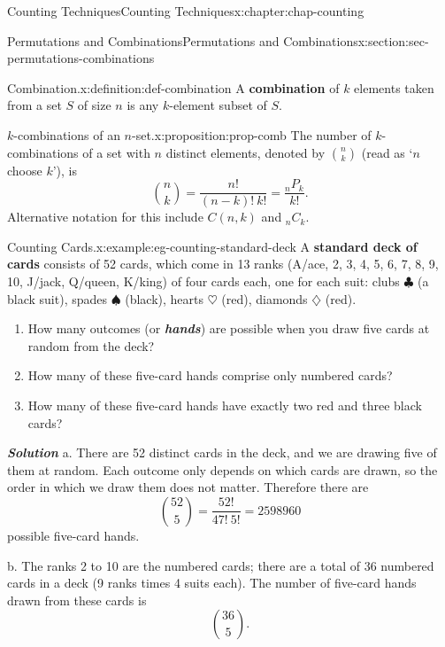 \documentclass[oneside,10pt,]{book}
\newcommand{\alert}[1]{\textbf{\textit{#1}}}
\newcommand{\terminology}[1]{\textbf{#1}}
\numberwithin{equation}{section}
\begin{document}
\begin{chapterptx}{Counting Techniques}{}{Counting Techniques}{}{}{x:chapter:chap-counting}
\begin{sectionptx}{Permutations and Combinations}{}{Permutations and Combinations}{}{}{x:section:sec-permutations-combinations}
\begin{definition}{Combination.}{x:definition:def-combination}
A \terminology{combination} of \(k\) elements taken from a set \(S\) of size \(n\) is any \(k\)-element subset of \(S\).%
\end{definition}
\begin{proposition}{\(k\)-combinations of an \(n\)-set.}{}{x:proposition:prop-comb}%
The number of \(k\)-combinations of a set with \(n\) distinct elements, denoted by \(\displaystyle\binom{n}{k}\) (read as `\(n\) choose \(k\)'), is%
\begin{equation*}
\binom{n}{k} = \dfrac{n!}{(n-k)!\ k!} = \dfrac{{}_nP_k}{k!}\text{.}
\end{equation*}
Alternative notation for this include \(C(n,k)\) and \(_nC_k\).%
\end{proposition}
\begin{example}{Counting Cards.}{x:example:eg-counting-standard-deck}%
A \terminology{standard deck of cards} consists of 52 cards, which come in 13 ranks (A\slash{}ace, 2, 3, 4, 5, 6, 7, 8, 9, 10, J\slash{}jack, Q\slash{}queen, K\slash{}king) of four cards each, one for each suit: clubs \(\clubsuit\) (a black suit), spades \(\spadesuit\) (black), hearts \(\heartsuit\) (red), diamonds \(\diamondsuit\) (red).%
\begin{enumerate}[label=(\alph*)]
\item{}How many outcomes (or \alert{hands}) are possible when you draw five cards at random from the deck?%
\item{}How many of these five-card hands comprise only numbered cards?%
\item{}How many of these five-card hands have exactly two red and three black cards?%
\end{enumerate}
%
\par
\alert{Solution} a. There are 52 distinct cards in the deck, and we are drawing five of them at random. Each outcome only depends on which cards are drawn, so the order in which we draw them does not matter. Therefore there are%
\begin{equation*}
\binom{52}{5} = \frac{52!}{47! \ 5!} = 2598960
\end{equation*}
possible five-card hands.%
\par
b. The ranks 2 to 10 are the numbered cards; there are a total of 36 numbered cards in a deck (9 ranks times 4 suits each). The number of five-card hands drawn from these cards is%
\begin{equation*}
\binom{36}{5}\text{.}
\end{equation*}
%
\par

\end{example}
\end{sectionptx}
\end{chapterptx}
\end{document}
